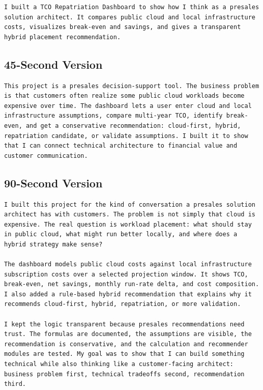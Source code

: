 \documentclass[11pt,a4paper]{article}
\begin{document}
\begin{lstlisting}
I built a TCO Repatriation Dashboard to show how I think as a presales solution architect. It compares public cloud and local infrastructure costs, visualizes break-even and savings, and gives a transparent hybrid placement recommendation.
\end{lstlisting}

\subsection{45-Second Version}

\begin{lstlisting}
This project is a presales decision-support tool. The business problem is that customers often realize some public cloud workloads become expensive over time. The dashboard lets a user enter cloud and local infrastructure assumptions, compare multi-year TCO, identify break-even, and get a conservative recommendation: cloud-first, hybrid, repatriation candidate, or validate assumptions. I built it to show that I can connect technical architecture to financial value and customer communication.
\end{lstlisting}

\subsection{90-Second Version}

\begin{lstlisting}
I built this project for the kind of conversation a presales solution architect has with customers. The problem is not simply that cloud is expensive. The real question is workload placement: what should stay in public cloud, what might run better locally, and where does a hybrid strategy make sense?

The dashboard models public cloud costs against local infrastructure subscription costs over a selected projection window. It shows TCO, break-even, net savings, monthly run-rate delta, and cost composition. I also added a rule-based hybrid recommendation that explains why it recommends cloud-first, hybrid, repatriation, or more validation.

I kept the logic transparent because presales recommendations need trust. The formulas are documented, the assumptions are visible, the recommendation is conservative, and the calculation and recommender modules are tested. My goal was to show that I can build something technical while also thinking like a customer-facing architect: business problem first, technical tradeoffs second, recommendation third.
\end{lstlisting}
\end{document}
